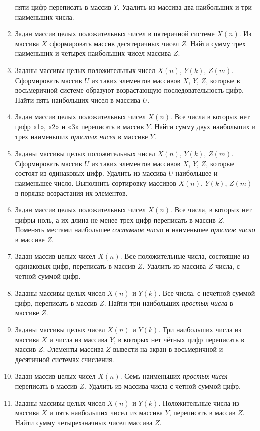 \begin{enumerate}
пяти цифр переписать в массив $Y$. Удалить из массива два наибольших и три наименьших числа.
\item Задан массив целых положительных чисел в пятеричной системе $X(n)$. Из массива
$X$ сформировать массив десятеричных чисел $Z$. Найти сумму трех наименьших и четырех наибольших
чисел массива $Z$. 
\item Заданы массивы целых положительных чисел $X(n)$, $Y(k)$,
$Z(m)$. Сформировать массив $U$ из таких элементов массивов
$X$, $Y$, $Z$, которые в восьмеричной системе образуют возрастающую
последовательность цифр. Найти пять наибольших чисел в массива $U$.
\item Задан массив целых положительных чисел $X(n)$. Все числа в которых нет цифр «1», «2» и
«3» переписать в массив $Y$. Найти сумму двух наибольших и трех наименьших \emph{простых
чисел} в массиве $Y$. 
\item Заданы массивы целых положительных чисел $X(n)$, $Y(k)$,
$Z(m)$. Сформировать массив $U$ из таких элементов массивов
$X$, $Y$, $Z$, которые состоят из одинаковых цифр. Удалить из массива
$U$ наибольшее и наименьшее число. Выполнить сортировку массивов $X(n)$,
$Y(k)$, $Z(m)$ в порядке возрастания их элементов.
\item Задан массив целых положительных чисел $X(n)$. Все числа, в которых нет цифры ноль, а их
длина не менее трех цифр переписать в массив $Z$. Поменять местами наибольшее \emph{составное
число} и наименьшее \emph{простое число} в массиве $Z$.
\item Задан массив целых чисел $X(n)$. Все положительные числа, состоящие из одинаковых цифр,
переписать в массив $Z$. Удалить из массива $Z$ числа, с четной суммой цифр.
\item Заданы массивы целых чисел $X(n)$ и $Y(k)$. Все числа, с
нечетной суммой цифр, переписать в массив $Z$. Найти три наибольших \emph{простых числа} в массиве $Z$.
\item Заданы массивы целых чисел $X(n)$ и $Y(k)$. Три наибольших числа
из массива $X$ и числа из массива $Y$, в которых нет чётных цифр переписать в массив
$Z$. Элементы массива $Z$ вывести на экран в восьмеричной и десятичной системах
счисления.
\item Задан массив целых чисел $X(n)$. Семь наименьших \emph{простых чисел}
переписать в массив $Z$. Удалить из массива числа с четной суммой цифр.
\item Заданы массивы целых чисел $X(n)$ и $Y(k)$. Положительные числа
из массива $X$ и пять наибольших чисел из массива $Y$, переписать в массив
$Z$. Найти сумму четырехзначных чисел массива $Z$.

\end{enumerate}
